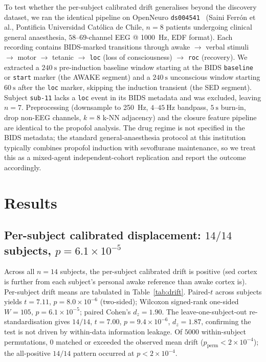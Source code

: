 \documentclass[11pt,a4paper]{article}
\begin{document}
To test whether the per-subject calibrated drift generalises beyond the discovery dataset, we ran the identical pipeline on OpenNeuro \texttt{ds004541}~\cite{sainiferron2023dataset} (Saini Ferr\'on et al., Pontificia Universidad Cat\'olica de Chile, $n=8$ patients undergoing clinical general anaesthesia, $58$--$69$-channel EEG @ \SI{1000}{\hertz}, EDF format). Each recording contains BIDS-marked transitions through awake $\rightarrow$ verbal stimuli $\rightarrow$ motor $\rightarrow$ tetanic $\rightarrow$ \texttt{loc} (loss of consciousness) $\rightarrow$ \texttt{roc} (recovery). We extracted a $\SI{240}{\second}$ pre-induction baseline window starting at the BIDS \texttt{baseline} or \texttt{start} marker (the AWAKE segment) and a $\SI{240}{\second}$ unconscious window starting $\SI{60}{\second}$ after the \texttt{loc} marker, skipping the induction transient (the SED segment). Subject \texttt{sub-11} lacks a \texttt{loc} event in its BIDS metadata and was excluded, leaving $n=7$. Preprocessing (downsample to \SI{250}{\hertz}, $4$--$\SI{45}{\hertz}$ bandpass, $\SI{5}{\second}$ burn-in, drop non-EEG channels, $k=8$ k-NN adjacency) and the closure feature pipeline are identical to the propofol analysis. The drug regime is not specified in the BIDS metadata; the standard general-anaesthesia protocol at this institution typically combines propofol induction with sevoflurane maintenance, so we treat this as a mixed-agent independent-cohort replication and report the outcome accordingly.

\section{Results}\label{sec:results}

\subsection{Per-subject calibrated displacement: $14/14$ subjects, $p=6.1\!\times\!10^{-5}$}

Across all $n=14$ subjects, the per-subject calibrated drift is positive (sed cortex is further from each subject's personal awake reference than awake cortex is). Per-subject drift means are tabulated in Table~\ref{tab:drift}. Paired-$t$ across subjects yields $t=7.11$, $p=8.0\!\times\!10^{-6}$ (two-sided); Wilcoxon signed-rank one-sided $W=105$, $p=6.1\!\times\!10^{-5}$; paired Cohen's $d_z=1.90$. The leave-one-subject-out re-standardisation gives $14/14$, $t=7.00$, $p=9.4\!\times\!10^{-6}$, $d_z=1.87$, confirming the test is not driven by within-data information leakage. Of $\num{5000}$ within-subject permutations, $0$ matched or exceeded the observed mean drift ($p_{\text{perm}}<2\!\times\!10^{-4}$); the all-positive $14/14$ pattern occurred at $p<2\!\times\!10^{-4}$.
\end{document}
